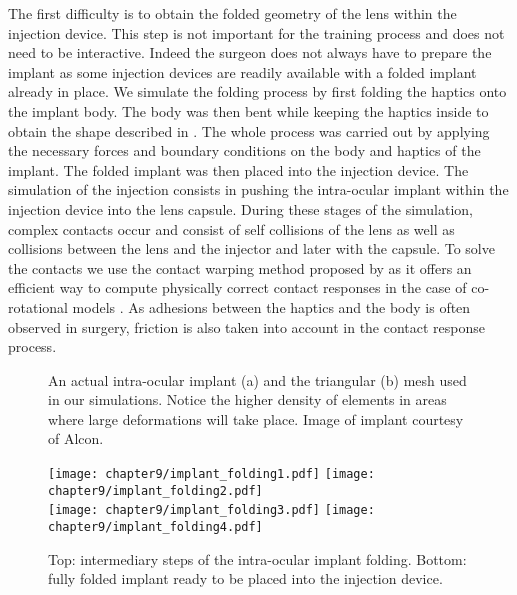 The first difficulty is to obtain the folded geometry of the lens within the injection device. This step is not important for the training process and does not need to be interactive. Indeed the surgeon does not always have to prepare the implant as some injection devices are readily available with a folded implant already in place. We simulate the folding process by first folding the haptics onto the implant body. The body was then bent while keeping the haptics inside to obtain the shape described in . The whole process was carried out by applying the necessary forces and boundary conditions on the body and haptics of the implant. The folded implant was then placed into the injection device. The simulation of the injection consists in pushing the intra-ocular implant within the injection device into the lens capsule. During these stages of the simulation, complex contacts occur and consist of self collisions of the lens as well as collisions between the lens and the injector and later with the capsule. To solve the contacts we use the contact warping method proposed by \cite{Saupin08} as it offers an efficient way to compute physically correct contact responses in the case of co-rotational models . As adhesions between the haptics and the body is often observed in surgery, friction is also taken into account in the contact response process.
%
\begin{figure}[ht]
\centering 
{}
\hspace{1cm} 
\caption [Lens implant and its mesh] {An actual intra-ocular implant (a) and the triangular (b) mesh used in our simulations. Notice the higher density of elements in areas where large deformations will take place. Image of implant courtesy of Alcon.}
\label{chap9:fig-mesh}
\end{figure}

\begin{figure}[ht]
\centering
\texttt{[image: chapter9/implant\_folding1.pdf]}
\texttt{[image: chapter9/implant\_folding2.pdf]} \\
\texttt{[image: chapter9/implant\_folding3.pdf]}
\texttt{[image: chapter9/implant\_folding4.pdf]}
\caption [Folding of intra-ocular implant] {Top: intermediary steps of the intra-ocular implant folding. Bottom: fully folded implant ready to be placed into the injection device.}
\label{chap9:fig-implantFolding}
\end{figure}


